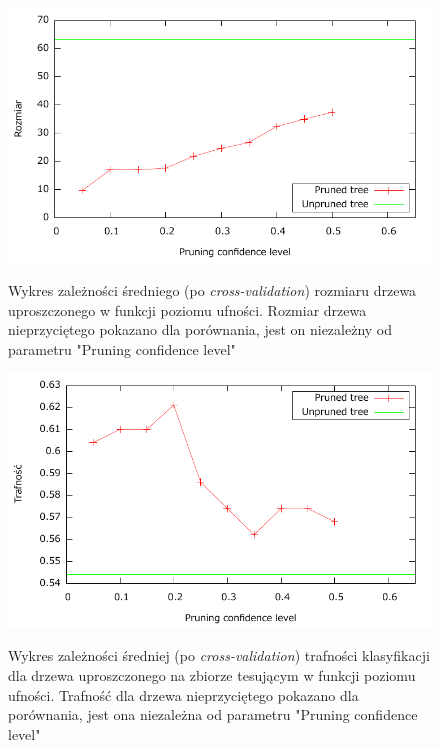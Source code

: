 \begin{itemize}
\begin{figure}	
	\includegraphics[scale=0.7]{figures/part1/task5/rozmiar.pdf}
	\label{p1t5-rozmiar}
	\caption{Wykres zależności średniego (po \emph{cross-validation}) rozmiaru drzewa uproszczonego w funkcji poziomu ufności. Rozmiar drzewa nieprzyciętego pokazano dla porównania, jest on niezależny od parametru "Pruning confidence level"}
\end{figure}

\begin{figure}	
	\includegraphics[scale=0.7]{figures/part1/task5/trafnosc.pdf}
	\label{p1t5-trafnosc}
	\caption{Wykres zależności średniej (po \emph{cross-validation}) trafności klasyfikacji dla drzewa uproszczonego na zbiorze tesującym w funkcji poziomu ufności. Trafność dla drzewa nieprzyciętego pokazano dla porównania, jest ona niezależna od parametru "Pruning confidence level" }
\end{figure}


\end{itemize}
